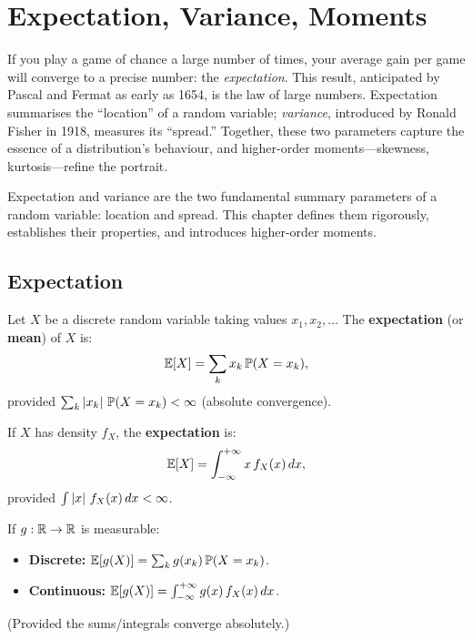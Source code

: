 \chapter{Expectation, Variance, Moments}
\label{ch:expectation}

If you play a game of chance a large number of times, your average gain per game will converge to a precise number: the \emph{expectation}. This result, anticipated by Pascal and Fermat as early as 1654, is the law of large numbers. Expectation summarises the ``location'' of a random variable; \emph{variance}, introduced by Ronald Fisher in 1918, measures its ``spread.'' Together, these two parameters capture the essence of a distribution's behaviour, and higher-order moments---skewness, kurtosis---refine the portrait.

\begin{intuition}
Expectation and variance are the two fundamental summary parameters of a random
variable: location and spread. This chapter defines them rigorously, establishes
their properties, and introduces higher-order moments.
\end{intuition}

\section{Expectation}

\begin{definition}
Let $X$ be a discrete random variable taking values $x_1, x_2, \ldots$
The \textbf{expectation} (or \textbf{mean}) of $X$ is:
\[
    \mathbb{E}[X] = \sum_{k} x_k\,\mathbb{P}(X = x_k),
\]
provided $\sum_k \left| x_k \right|\,\mathbb{P}(X = x_k) < \infty$ (absolute convergence).
\end{definition}

\begin{definition}
If $X$ has density $f_X$, the \textbf{expectation} is:
\[
    \mathbb{E}[X] = \int_{-\infty}^{+\infty} x\,f_X(x)\,dx,
\]
provided $\int \left| x \right|\,f_X(x)\,dx < \infty$.
\end{definition}

\begin{theorem}
\label{thm:lotus}
If $g : \mathbb{R} \to \mathbb{R}$ is measurable:
\begin{itemize}
    \item \textbf{Discrete:}
    $\mathbb{E}[g(X)] = \sum_k g(x_k)\,\mathbb{P}(X = x_k)$.
    \item \textbf{Continuous:}
    $\mathbb{E}[g(X)] = \int_{-\infty}^{+\infty} g(x)\,f_X(x)\,dx$.
\end{itemize}
(Provided the sums/integrals converge absolutely.)
\end{theorem}

